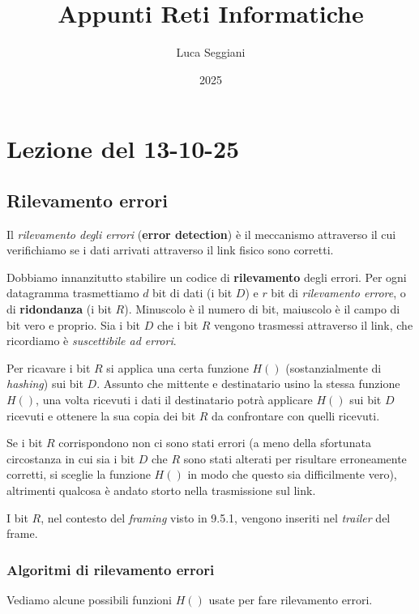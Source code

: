 \documentclass[a4paper,11pt]{article}
\title{Appunti Reti Informatiche}
\author{Luca Seggiani}
\date{2025}
\begin{document}
\section{Lezione del 13-10-25}

\thispagestyle{empty}
\pagestyle{fancy}

\subsection{Rilevamento errori}
Il \textit{rilevamento degli errori} (\textbf{error detection}) è il meccanismo attraverso il cui verifichiamo se i dati arrivati attraverso il link fisico sono corretti.

Dobbiamo innanzitutto stabilire un codice di \textbf{rilevamento} degli errori.
Per ogni datagramma trasmettiamo $d$ bit di dati (i bit $D$) e $r$ bit di \textit{rilevamento errore}, o di \textbf{ridondanza} (i bit $R$). Minuscolo è il numero di bit, maiuscolo è il campo di bit vero e proprio.
Sia i bit $D$ che i bit $R$ vengono trasmessi attraverso il link, che ricordiamo è \textit{suscettibile ad errori}.

Per ricavare i bit $R$ si applica una certa funzione $H()$ (sostanzialmente di \textit{hashing}) sui bit $D$. Assunto che mittente e destinatario usino la stessa funzione $H()$, una volta ricevuti i dati il destinatario potrà applicare $H()$ sui bit $D$ ricevuti e ottenere la sua copia dei bit $R$ da confrontare con quelli ricevuti.

Se i bit $R$ corrispondono non ci sono stati errori (a meno della sfortunata circostanza in cui sia i bit $D$ che $R$ sono stati alterati per risultare erroneamente corretti, si sceglie la funzione $H()$ in modo che questo sia difficilmente vero), altrimenti qualcosa è andato storto nella trasmissione sul link.

I bit $R$, nel contesto del \textit{framing} visto in 9.5.1, vengono inseriti nel \textit{trailer} del frame.

\subsubsection{Algoritmi di rilevamento errori}
Vediamo alcune possibili funzioni $H()$ usate per fare rilevamento errori.
\end{document}
